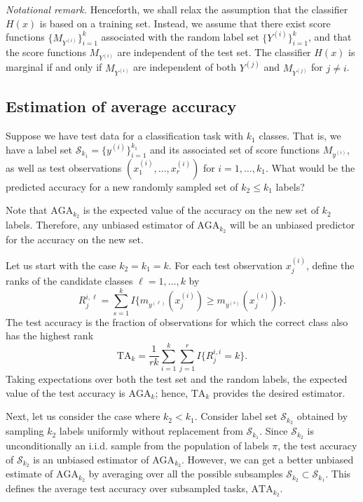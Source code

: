 \documentclass[twoside,11pt]{article}
\begin{document}
\emph{Notational remark.}  Henceforth, we shall relax the assumption that the classifier $H(x)$ is based on a training set.  Instead, we assume that there exist score functions $\{M_{Y^{(i)}}\}_{i=1}^k$ associated with the random label set $\{Y^{(i)}\}_{i=1}^k$, and that the score functions $M_{Y^{(i)}}$ are independent of the test set.  The classifier $H(x)$ is marginal if and only if $M_{Y^{(i)}}$ are independent of both $Y^{(j)}$ and $M_{Y^{(j)}}$ for $j \neq i$.

\subsection{Estimation of average accuracy}\label{sec:estimation_average_accuracy}

Suppose we have test data for a classification task with $k_1$ classes.  That is, we have a label set $\mathcal{S}_{k_1} =
\{y^{(i)}\}_{i=1}^{k_1}$ and its associated set of score functions
 $M_{y^{(i)}}$, as well as test observations $(x_1^{(i)},\hdots, x_{r}^{(i)})$ for $i =
1,\hdots, k_1$.  What would be the predicted accuracy for 
a new randomly sampled set of $k_2 \leq k_1$ labels? 

Note that $\text{AGA}_{k_2}$
is the expected value of the accuracy on the
new set of $k_2$ labels.  Therefore, any unbiased estimator of $\text{AGA}_{k_2}$ will be an unbiased predictor for the accuracy on the new set.

Let us start with the case $k_2 = k_1 = k$.  For each test observation $x_j^{(i)}$, define the ranks of the candidate classes $\ell = 1,\hdots, k$ by
\[
R_{j}^{i, \ell} = \sum_{s = 1}^k I\{m_{y^{(\ell)}}(x_j^{(i)}) \geq m_{y^{(s)}}(x_j^{(i)})\}.
\]
The test accuracy is the fraction of observations for which the correct class also has the highest rank
\begin{equation}\label{eq:test_risk}
\text{TA}_k = \frac{1}{r k} \sum_{i=1}^{k} \sum_{j=1}^{r} I\{R_j^{i,i} = k\}.
\end{equation}
Taking expectations over both the test set and the random labels, the expected value of the test accuracy is $\text{AGA}_k$; hence, $\text{TA}_k$ provides the desired estimator.

Next, let us consider the case where $k_2 < k_1$.  
Consider label set $\mathcal{S}_{k_2}$ obtained
by sampling $k_2$ labels uniformly without replacement from
$\mathcal{S}_{k_1}$. Since $\mathcal{S}_{k_2}$ is unconditionally an i.i.d. sample from 
the population of labels $\pi$, the test accuracy of $\mathcal{S}_{k_2}$ is an unbiased estimator of $\text{AGA}_{k_2}$.
However, we can get a better unbiased estimate of
$\text{AGA}_{k_2}$ by averaging over all the possible subsamples
$\mathcal{S}_{k_2} \subset \mathcal{S}_{k_1}$. 
This defines the average test accuracy over subsampled tasks, $\text{ATA}_{k_2}$.
\end{document}
